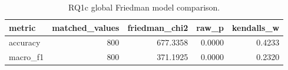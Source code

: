 \begin{table}[tbp]
\caption{RQ1c global Friedman model comparison.}
\label{tab:rq1c_global_model_friedman}
\begin{tabular}{lrrrr}
\toprule
metric & matched\_values & friedman\_chi2 & raw\_p & kendalls\_w \\
\midrule
accuracy & 800 & 677.3358 & 0.0000 & 0.4233 \\
macro\_f1 & 800 & 371.1925 & 0.0000 & 0.2320 \\
\bottomrule
\end{tabular}
\end{table}

